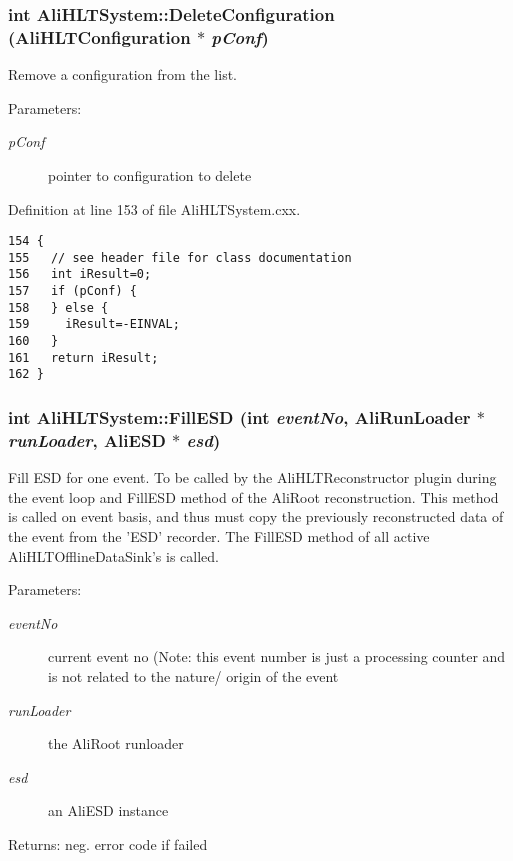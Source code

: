 \subsubsection{\setlength{\rightskip}{0pt plus 5cm}int Ali\-HLTSystem::Delete\-Configuration ({\bf Ali\-HLTConfiguration} $\ast$ {\em p\-Conf})}\label{classAliHLTSystem_a6}


Remove a configuration from the list. \begin{Desc}
\item[Parameters:]
\begin{description}
\item[{\em p\-Conf}]pointer to configuration to delete \end{description}
\end{Desc}


Definition at line 153 of file Ali\-HLTSystem.cxx.

\footnotesize\begin{verbatim}154 {
155   // see header file for class documentation
156   int iResult=0;
157   if (pConf) {
158   } else {
159     iResult=-EINVAL;
160   }
161   return iResult;
162 }
\end{verbatim}\normalsize 


\subsubsection{\setlength{\rightskip}{0pt plus 5cm}int Ali\-HLTSystem::Fill\-ESD (int {\em event\-No}, Ali\-Run\-Loader $\ast$ {\em run\-Loader}, Ali\-ESD $\ast$ {\em esd})}\label{classAliHLTSystem_a21}


Fill ESD for one event. To be called by the Ali\-HLTReconstructor plugin during the event loop and Fill\-ESD method of the Ali\-Root reconstruction. This method is called on event basis, and thus must copy the previously reconstructed data of the event from the 'ESD' recorder. The Fill\-ESD method of all active Ali\-HLTOffline\-Data\-Sink's is called. \begin{Desc}
\item[Parameters:]
\begin{description}
\item[{\em event\-No}]current event no (Note: this event number is just a processing counter and is not related to the nature/ origin of the event \item[{\em run\-Loader}]the Ali\-Root runloader \item[{\em esd}]an Ali\-ESD instance \end{description}
\end{Desc}
\begin{Desc}
\item[Returns:]neg. error code if failed \end{Desc}


